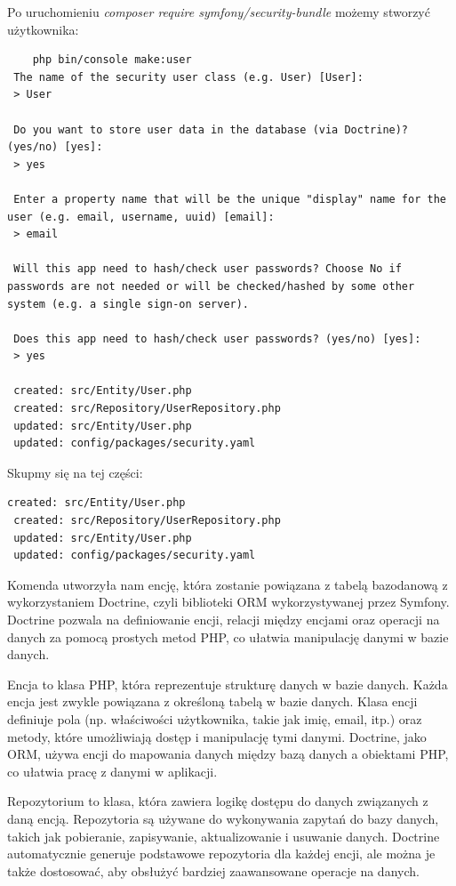 \documentclass[polish, a4paper]{article}
\begin{document}
Po uruchomieniu \emph{composer require symfony/security-bundle} możemy stworzyć użytkownika:

\begin{verbatim}
    php bin/console make:user
 The name of the security user class (e.g. User) [User]:
 > User

 Do you want to store user data in the database (via Doctrine)? (yes/no) [yes]:
 > yes

 Enter a property name that will be the unique "display" name for the user (e.g. email, username, uuid) [email]:
 > email

 Will this app need to hash/check user passwords? Choose No if passwords are not needed or will be checked/hashed by some other system (e.g. a single sign-on server).

 Does this app need to hash/check user passwords? (yes/no) [yes]:
 > yes

 created: src/Entity/User.php
 created: src/Repository/UserRepository.php
 updated: src/Entity/User.php
 updated: config/packages/security.yaml
\end{verbatim}

Skupmy się na tej części:

\begin{verbatim}
created: src/Entity/User.php
 created: src/Repository/UserRepository.php
 updated: src/Entity/User.php
 updated: config/packages/security.yaml
\end{verbatim}

Komenda utworzyła nam encję, która zostanie powiązana z tabelą bazodanową z wykorzystaniem Doctrine, czyli biblioteki ORM wykorzystywanej przez Symfony. Doctrine pozwala na definiowanie encji, relacji między encjami oraz operacji na danych za pomocą prostych metod PHP, co ułatwia manipulację danymi w bazie danych.

Encja to klasa PHP, która reprezentuje strukturę danych w bazie danych. Każda encja jest zwykle powiązana z określoną tabelą w bazie danych. Klasa encji definiuje pola (np. właściwości użytkownika, takie jak imię, email, itp.) oraz metody, które umożliwiają dostęp i manipulację tymi danymi. Doctrine, jako ORM, używa encji do mapowania danych między bazą danych a obiektami PHP, co ułatwia pracę z danymi w aplikacji.

Repozytorium to klasa, która zawiera logikę dostępu do danych związanych z daną encją. Repozytoria są używane do wykonywania zapytań do bazy danych, takich jak pobieranie, zapisywanie, aktualizowanie i usuwanie danych. Doctrine automatycznie generuje podstawowe repozytoria dla każdej encji, ale można je także dostosować, aby obsłużyć bardziej zaawansowane operacje na danych.
\end{document}
